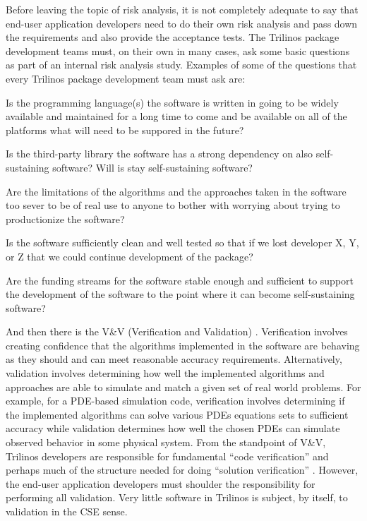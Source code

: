 \documentclass[11pt]{SANDreport}
\begin{document}
Before leaving the topic of risk analysis, it is not completely
adequate to say that end-user application developers need to do their
own risk analysis and pass down the requirements and also provide the
acceptance tests.  The Trilinos package development teams must, on
their own in many cases, ask some basic questions as part of an
internal risk analysis study.  Examples of some of the questions that
every Trilinos package development team must ask are:

\begin{compactitem}

{}\item Is the programming language(s) the software is written in
going to be widely available and maintained for a long time to come
and be available on all of the platforms what will need to be suppored
in the future?

{}\item Is the third-party library the software has a strong
dependency on also self-sustaining software?  Will is stay
self-sustaining software?

{}\item Are the limitations of the algorithms and the approaches taken
in the software too sever to be of real use to anyone to bother with
worrying about trying to productionize the software?

{}\item Is the software sufficiently clean and well tested so that if
we lost developer X, Y, or Z that we could continue development of the
package?

{}\item Are the funding streams for the software stable enough and
sufficient to support the development of the software to the point
where it can become self-sustaining software?

\end{compactitem}

And then there is the V\&V (Verification and Validation)
{}\cite{SEVVIntersections05}.  Verification involves creating
confidence that the algorithms implemented in the software are
behaving as they should and can meet reasonable accuracy requirements.
Alternatively, validation involves determining how well the
implemented algorithms and approaches are able to simulate and match a
given set of real world problems.  For example, for a PDE-based
simulation code, verification involves determining if the implemented
algorithms can solve various PDEs equations sets to sufficient
accuracy while validation determines how well the chosen PDEs can
simulate observed behavior in some physical system.  From the
standpoint of V\&V, Trilinos developers are responsible for
fundamental ``code verification'' and perhaps much of the structure
needed for doing ``solution verification''
{}\cite{SEVVIntersections05}.  However, the end-user application
developers must shoulder the responsibility for performing all
validation.  Very little software in Trilinos is subject, by itself,
to validation in the CSE sense.
\end{document}
